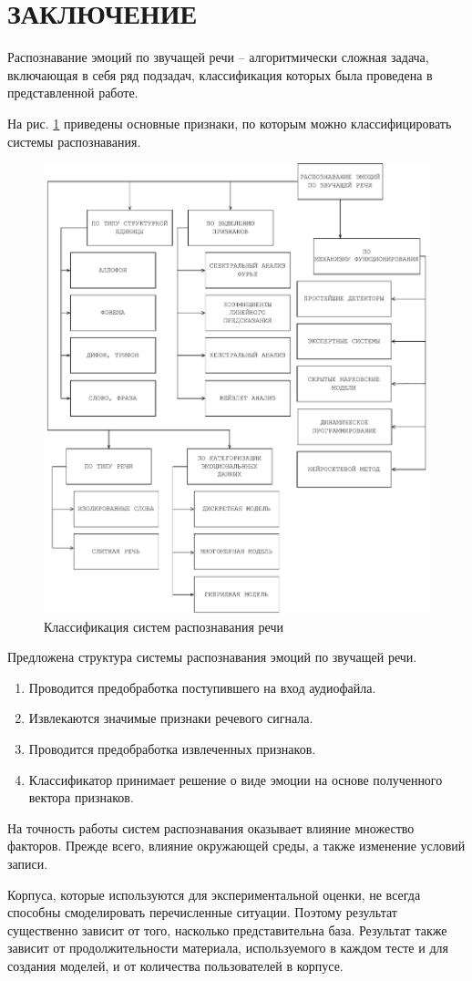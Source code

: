 \chapter*{ЗАКЛЮЧЕНИЕ}

Распознавание эмоций по звучащей речи -- алгоритмически сложная задача, включающая в себя ряд подзадач, классификация которых была проведена в представленной работе.

На рис. \ref{fig:classification} приведены основные признаки, по которым можно классифицировать системы распознавания.

\begin{figure}[H]
	\centering
	\includegraphics[width=0.85\linewidth]{assets/class}
	\caption{Классификация систем распознавания речи}
	\label{fig:classification}
\end{figure}


Предложена структура системы распознавания эмоций по звучащей речи. 
\begin{enumerate}
	\item Проводится предобработка поступившего на вход аудиофайла.
	\item Извлекаются значимые признаки речевого сигнала.
	\item Проводится предобработка извлеченных признаков. 
	\item Классификатор принимает решение о виде эмоции на основе полученного вектора признаков.
\end{enumerate}

На точность работы систем распознавания оказывает влияние множество факторов. Прежде всего, влияние окружающей среды, а также изменение условий записи.

Корпуса, которые используются для экспериментальной оценки, не всегда способны смоделировать перечисленные ситуации. Поэтому результат существенно зависит от того, насколько представительна база. Результат также зависит от продолжительности материала, используемого в каждом тесте и для создания моделей, и от количества пользователей в корпусе.